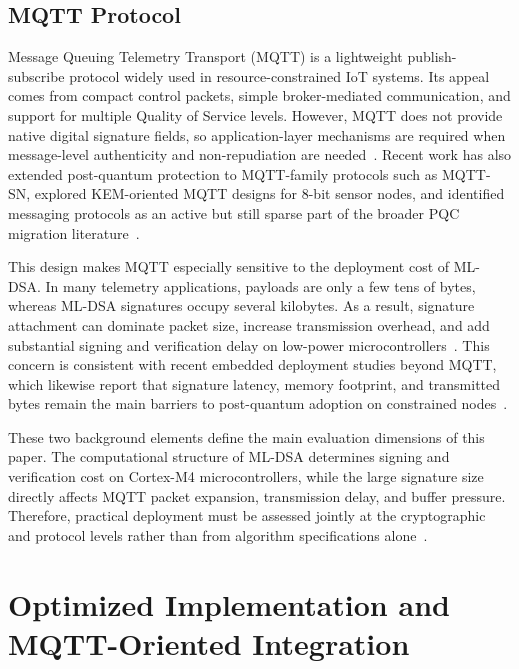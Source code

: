 \documentclass[final, twoside]{IEEEtran} %
\begin{document}
\subsection{MQTT Protocol}

Message Queuing Telemetry Transport (MQTT) is a lightweight publish-subscribe protocol widely used in resource-constrained IoT systems. Its appeal comes from compact control packets, simple broker-mediated communication, and support for multiple Quality of Service levels. However, MQTT does not provide native digital signature fields, so application-layer mechanisms are required when message-level authenticity and non-repudiation are needed~\cite{Samandari2023,Rampazzo2023}. Recent work has also extended post-quantum protection to MQTT-family protocols such as MQTT-SN, explored KEM-oriented MQTT designs for 8-bit sensor nodes, and identified messaging protocols as an active but still sparse part of the broader PQC migration literature~\cite{BlancoRomero2024,Kim2025,Egbuagha2025}.

This design makes MQTT especially sensitive to the deployment cost of ML-DSA. In many telemetry applications, payloads are only a few tens of bytes, whereas ML-DSA signatures occupy several kilobytes. As a result, signature attachment can dominate packet size, increase transmission overhead, and add substantial signing and verification delay on low-power microcontrollers~\cite{Samandari2023,Rampazzo2023,Kim2025,BlancoRomero2024}. This concern is consistent with recent embedded deployment studies beyond MQTT, which likewise report that signature latency, memory footprint, and transmitted bytes remain the main barriers to post-quantum adoption on constrained nodes~\cite{Banegas2021,Marchsreiter2024,pqm4-benchmarks}.

These two background elements define the main evaluation dimensions of this paper. The computational structure of ML-DSA determines signing and verification cost on Cortex-M4 microcontrollers, while the large signature size directly affects MQTT packet expansion, transmission delay, and buffer pressure. Therefore, practical deployment must be assessed jointly at the cryptographic and protocol levels rather than from algorithm specifications alone~\cite{Khalid2019,Ghosh2019,pqm4-benchmarks}.

\section{Optimized Implementation and MQTT-Oriented Integration}\label{sec:architecture}
\end{document}
